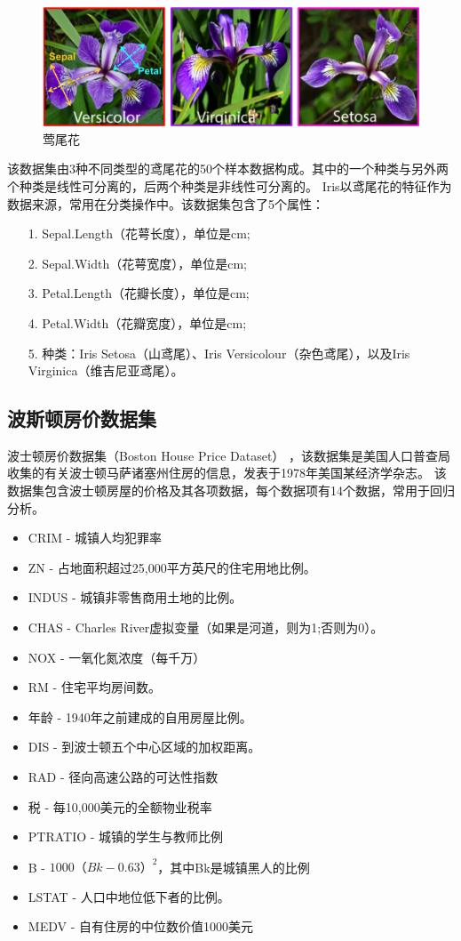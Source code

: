 \begin{figure}[!htb]
\centerline{\includegraphics[width=.4\figwidth]{images/iris.png}}
\label{fig:part3_iris_flower}
\caption{莺尾花}
\end{figure}

该数据集由3种不同类型的鸢尾花的50个样本数据构成。其中的一个种类与另外两个种类是线性可分离的，后两个种类是非线性可分离的。
Iris以鸢尾花的特征作为数据来源，常用在分类操作中。该数据集包含了5个属性：

\begin{itemize}
\item[1.] Sepal.Length（花萼长度），单位是cm;
\item[2.] Sepal.Width（花萼宽度），单位是cm;
\item[3.] Petal.Length（花瓣长度），单位是cm;
\item[4.] Petal.Width（花瓣宽度），单位是cm;
\item[5.] 种类：Iris Setosa（山鸢尾）、Iris Versicolour（杂色鸢尾），以及Iris Virginica（维吉尼亚鸢尾）。
\end{itemize}


\subsection{波斯顿房价数据集}
波士顿房价数据集（Boston House Price Dataset）
，该数据集是美国人口普查局收集的有关波士顿马萨诸塞州住房的信息，发表于1978年美国某经济学杂志。
该数据集包含波士顿房屋的价格及其各项数据，每个数据项有14个数据，常用于回归分析。
\begin{itemize}
\item CRIM    - 城镇人均犯罪率
\item ZN      - 占地面积超过25,000平方英尺的住宅用地比例。
\item INDUS   - 城镇非零售商用土地的比例。
\item CHAS    - Charles River虚拟变量（如果是河道，则为1;否则为0）。
\item NOX     - 一氧化氮浓度（每千万）
\item RM      - 住宅平均房间数。
\item 年龄     - 1940年之前建成的自用房屋比例。
\item DIS     - 到波士顿五个中心区域的加权距离。
\item RAD     - 径向高速公路的可达性指数
\item 税       - 每10,000美元的全额物业税率
\item PTRATIO - 城镇的学生与教师比例
\item B       - $1000（Bk - 0.63）^ 2$，其中Bk是城镇黑人的比例
\item LSTAT   - 人口中地位低下者的比例。
\item MEDV    - 自有住房的中位数价值1000美元
\end{itemize}


